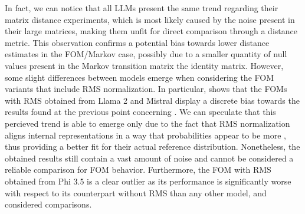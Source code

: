 In fact, we can notice that all LLMs present the same trend regarding their matrix distance experiments, which is most likely caused by the noise present in their large matrices, making them unfit for direct comparison through a distance metric.
This observation confirms a potential bias towards lower distance estimates in the FOM/Markov case, possibly due to a smaller quantity of null values present in the Markov transition matrix  the identity matrix.
However, some slight differences between models emerge when considering the FOM variants that include RMS normalization.
In particular,  shows that the FOMs with RMS obtained from Llama 2 and Mistral display a discrete bias towards the results found at the previous point concerning .
We can speculate that this percieved trend is able to emerge only due to the fact that RMS normalization aligns internal representations in a way that probabilities appear to be more , thus providing a better fit for their actual reference distribution.
Nonetheless, the obtained results still contain a vast amount of noise and cannot be considered a reliable comparison for FOM behavior.
Furthermore, the FOM with RMS obtained from Phi 3.5 is a clear outlier as its performance is significantly worse with respect to its counterpart without RMS than any other model, and  considered comparisons.

\begin{table}
    \centering
    \end{table}


